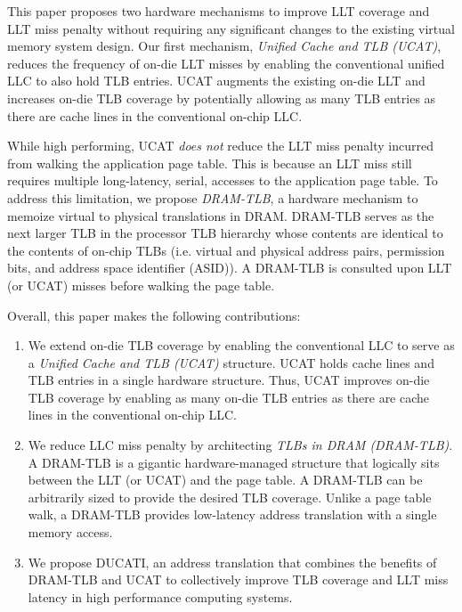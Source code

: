 This paper proposes two hardware mechanisms to improve LLT coverage
and LLT miss penalty without requiring any significant changes to the
existing virtual memory system design. Our first mechanism, {\em
Unified Cache and TLB (UCAT)}, reduces the frequency of on-die LLT
misses by enabling the conventional unified LLC to also hold TLB
entries. UCAT augments the existing on-die LLT and increases on-die
TLB coverage by potentially allowing as many TLB entries as there are
cache lines in the conventional on-chip LLC.


While high performing, UCAT {\em does not} reduce the LLT miss penalty
incurred from walking the application page table. This is because an
LLT miss still requires multiple long-latency, serial, accesses to the
application page table. To address this limitation, we propose {\em
DRAM-TLB}, a hardware mechanism to memoize virtual to physical
translations in DRAM. DRAM-TLB serves as the next larger TLB in the
processor TLB hierarchy whose contents are identical to the contents
of on-chip TLBs (i.e. virtual and physical address pairs, permission
bits, and address space identifier (ASID)). A DRAM-TLB is consulted
upon LLT (or UCAT) misses before walking the page table.


Overall, this paper makes the following contributions:

\begin{enumerate}

  \item{We extend on-die TLB coverage by enabling the conventional LLC
    to serve as a {\em Unified Cache and TLB (UCAT)} structure. UCAT
    holds cache lines and TLB entries in a single hardware structure.
    Thus, UCAT improves on-die TLB coverage by enabling as many on-die
    TLB entries as there are cache lines in the conventional on-chip
    LLC.}

  \item{We reduce LLC miss penalty by architecting {\em TLBs in DRAM
    (DRAM-TLB)}. A DRAM-TLB is a gigantic hardware-managed structure
    that logically sits between the LLT (or UCAT) and the page table.
    A DRAM-TLB can be arbitrarily sized to provide the desired TLB
    coverage. Unlike a page table walk, a DRAM-TLB provides
    low-latency address translation with a single memory access. }


  \item{We propose DUCATI, an address translation that combines the
  benefits of DRAM-TLB and UCAT to collectively improve TLB coverage
  and LLT miss latency in high performance computing systems.}

\end{enumerate}

